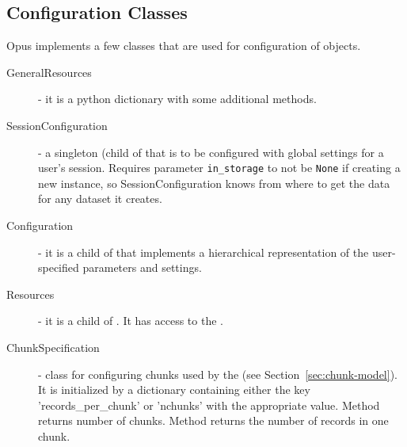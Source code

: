 \subsection{Configuration Classes}
\label{sec:resources} 
%
Opus implements a few classes that are used for configuration of objects.
\begin{description}
\item[GeneralResources] -   it is a python dictionary with some additional methods.
\item[SessionConfiguration] -   a singleton (child of  that is to be configured
        with global settings for a user's session.  Requires parameter
        \verb|in_storage| to not be \verb|None| if creating a new instance, so
        SessionConfiguration knows from where to get the data for any dataset it
        creates.
\item[Configuration] -    
  it is a child of  that implements a hierarchical
        representation of the user-specified parameters and settings.
\item[Resources] -   it is a child of . It has access to the
.
\item[ChunkSpecification] -   class for configuring chunks used by the  (see 
Section~\ref{sec:chunk-model}). It is initialized by a dictionary containing either the key 'records_per_chunk' or
'nchunks' with the appropriate value. Method  returns number of chunks. Method 
returns the number of records in one chunk.
\end{description}


